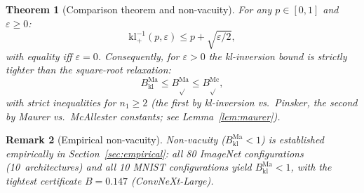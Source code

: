 \documentclass[11pt,a4paper]{article}
\newtheorem{theorem}{Theorem}
\newtheorem{remark}[theorem]{Remark}
\newcommand{\kl}{\mathrm{kl}}
\newcommand{\klinv}{\kl^{-1}_+}
\begin{document}
\begin{theorem}[Comparison theorem and non-vacuity]
\label{thm:comparison}
For any $p \in [0,1]$ and $\varepsilon \ge 0$:
\[
\klinv(p, \varepsilon) \le p + \sqrt{\varepsilon/2},
\]
with equality iff $\varepsilon = 0$. Consequently, for $\varepsilon > 0$ the kl-inversion bound is strictly tighter than the square-root relaxation:
\[
B_{\kl}^{\mathrm{Ma}} \le B_{\sqrt{}}^{\mathrm{Ma}} \le B_{\sqrt{}}^{\mathrm{Mc}},
\]
with strict inequalities for $n_1 \ge 2$ (the first by kl-inversion vs.\ Pinsker, the second by Maurer vs.\ McAllester constants; see Lemma~\ref{lem:maurer}).
\end{theorem}

\begin{remark}[Empirical non-vacuity]
Non-vacuity ($B_{\kl}^{\mathrm{Ma}} < 1$) is established empirically in Section~\ref{sec:empirical}: all 80 ImageNet configurations (10~architectures) and all 10 MNIST configurations yield $B_{\kl}^{\mathrm{Ma}} < 1$, with the tightest certificate $B = 0.147$ (ConvNeXt-Large).
\end{remark}
\end{document}
